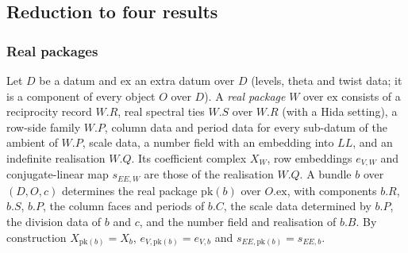 \subsection{Reduction to four results}\label{sec:pf:open0a:reduction}

\subsubsection{Real packages}
Let $D$ be a datum and $\mathrm{ex}$ an extra datum over $D$ (levels, theta and twist data; it is a component of every
object $O$ over $D$). A \emph{real package} $W$ over $\mathrm{ex}$ consists of a reciprocity record $W.R$, real spectral
ties $W.S$ over $W.R$ (with a Hida setting), a row-side family $W.P$, column data and period data for every sub-datum
of the ambient of $W.P$, scale data, a number field with an embedding into $\mathit{LL}$, and an indefinite
realisation $W.Q$. Its coefficient complex $X_W$, row embeddings $e_{V,W}$ and conjugate-linear map $s_{EE,W}$ are
those of the realisation $W.Q$. A bundle $b$ over $(D,O,c)$ determines the real package $\mathrm{pk}(b)$ over
$O.\mathrm{ex}$, with components $b.R$, $b.S$, $b.P$, the column faces and periods of $b.C$, the scale data determined
by $b.P$, the division data of $b$ and $c$, and the number field and realisation of $b.B$. By construction
$X_{\mathrm{pk}(b)}=X_b$, $e_{V,\mathrm{pk}(b)}=e_{V,b}$ and $s_{EE,\mathrm{pk}(b)}=s_{EE,b}$.

